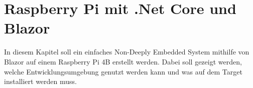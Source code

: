 \chapter{Raspberry Pi mit .Net Core und Blazor}
\label{chp:RaspMitBlazor}
In diesem Kapitel soll ein einfaches Non-Deeply Embedded System mithilfe von Blazor auf einem
Raspberry Pi 4B erstellt werden. Dabei soll gezeigt werden, welche Entwicklungsumgebung genutzt
werden kann und was auf dem Target installiert werden muss.



%
